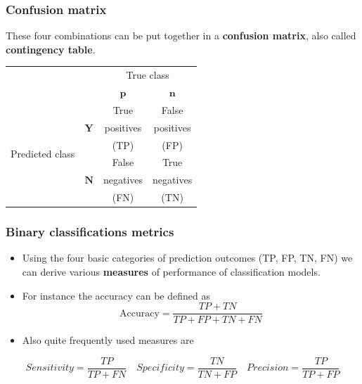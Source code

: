 \documentclass[notes]{beamer}          %
\newcommand{\vect}[1]{\bm{#1}}
\begin{document}
\begin{frame}
\frametitle{Confusion matrix}
     These four combinations can be put together in a {\bf confusion matrix}, also called {\bf contingency table}.
     \begin{table}[Confusion Matrix]
            \begin{tabular}{c|c|c|c|}
            \multicolumn{2}{c}{} & \multicolumn{2}{c}{True class} \\
            \cline{3-4}
            \multicolumn{2}{c|}{} & $\vect{p}$ & $\vect{n}$ \\
            \cline{2-4}
            \multirow{6}{*}{Predicted class} & \multirow{3}{*}{$\vect{Y}$} &  True & False  \\
                &   & positives & positives  \\
                &   & (TP) & (FP) \\
            \cline{2-4}
                & \multirow{3}{*}{$\vect{N}$} & False &  True  \\
                &   &  negatives & negatives  \\
                &   & (FN) & (TN) \\
            \cline{2-4}
            \end{tabular}
        \end{table}
\end{frame}



\begin{frame}
 \frametitle{Binary classifications metrics}
    \begin{itemize}
        \item Using the four basic categories of prediction outcomes (TP, FP, TN, FN) we can derive various {\bf  measures} of performance of classification models.
        \item For instance the accuracy can be defined as
        $$\mbox{Accuracy} = \frac{TP+TN}{TP+FP+TN+FN}$$
        \item Also quite frequently used measures are \\

    \end{itemize}
    \small{
        $$Sensitivity = \frac{TP}{TP+FN} \hspace{1em} Specificity = \frac{TN}{TN+FP} \hspace{1em} Precision = \frac{TP}{TP+FP}$$
        }
\end{frame}
\end{document}
